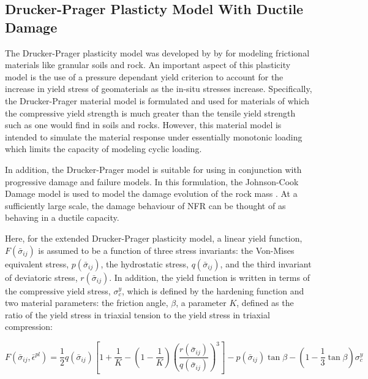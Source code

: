\subsection{Drucker-Prager Plasticty Model With Ductile Damage}
The Drucker-Prager plasticity model was developed by by \citet{drucker_implications_1950} for modeling frictional materials like granular soils and rock. An important aspect of this plasticity model is the use of a pressure dependant yield criterion to account for the increase in yield stress of geomaterials as the in-situ stresses increase. Specifically, the Drucker-Prager material model is formulated and used for materials of which the compressive yield strength is much greater than the tensile yield strength such as one would find in soils and rocks. However, this material model is intended to simulate the material response under essentially monotonic loading which limits the capacity of modeling cyclic loading.

In addition, the Drucker-Prager model is suitable for using in conjunction with progressive damage and failure models. In this formulation, the Johnson-Cook Damage model is used to model the damage evolution of the rock mass \cite{johnson_fracture_1985}. At a sufficiently large scale, the damage behaviour of NFR can be thought of as behaving in a ductile capacity. 

Here, for the extended Drucker-Prager plasticity model, a linear yield function, $F\left(\bar{\sigma}_{ij}\right)$ is assumed to be a function of three stress invariants: the Von-Mises equivalent stress, $p\left(\bar{\sigma}_{ij}\right)$, the hydrostatic stress, $q\left(\bar{\sigma}_{ij}\right)$, and the third invariant of deviatoric stress, $r\left(\bar{\sigma}_{ij}\right)$. In addition, the yield function is written in terms of the compressive yield stress, $\sigma_c^y$, which is defined by the hardening function and two material parameters: the friction angle, $\beta$, a parameter $K$, defined as the ratio of the yield stress in triaxial tension to the yield stress in triaxial compression:

\begin{equation}
F\left(\bar{\sigma}_{ij}, \bar{\epsilon}^{pl}\right)=\frac{1}{2}q\left(\bar{\sigma}_{ij}\right)\left [ 1+\frac{1}{K}-\left ( 1-\frac{1}{K} \right )\left ( \frac{r\left(\bar{\sigma}_{ij}\right)}{q\left(\bar{\sigma}_{ij}\right)} \right )^3 \right ]-p\left(\bar{\sigma}_{ij}\right)\tan\beta - \left(1-\frac{1}{3}\tan\beta \right)\sigma_c^y
\label{eqn:const8c}
\end{equation}

